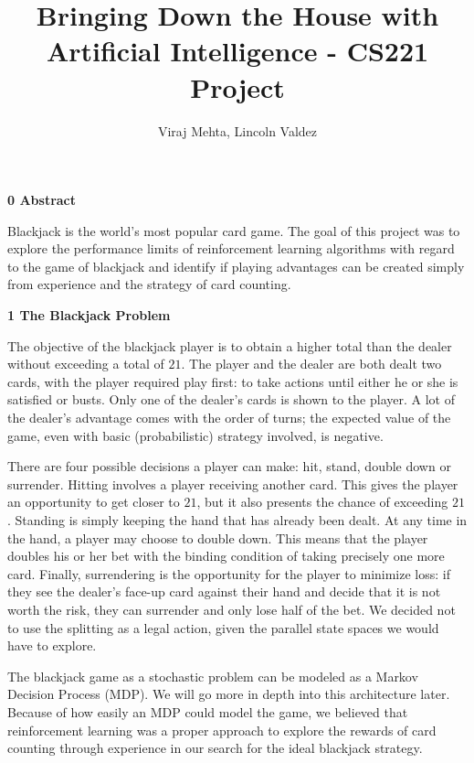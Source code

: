 \documentclass[12pt]{article}
\title{Bringing Down the House with Artificial Intelligence - CS221 Project}
\author{Viraj Mehta, Lincoln Valdez}
\date{}
\begin{document}
	\maketitle
	\vspace{-0.3in}

    {\large \textbf{0 Abstract}} \newline

    Blackjack is the world's most popular card game. The goal of this project was to explore the performance limits of reinforcement learning algorithms with regard to the game of blackjack and identify if playing advantages can be created simply from experience and the strategy of card counting. \newline

    {\large \textbf{1 The Blackjack Problem}} \newline

    The objective of the blackjack player is to obtain a higher total than the dealer without exceeding a total of $21$. The player and the dealer are both dealt two cards, with the player required play first: to take actions until either he or she is satisfied or busts. Only one of the dealer's cards is shown to the player. A lot of the dealer's advantage comes with the order of turns; the expected value of the game, even with basic (probabilistic) strategy involved, is negative. \newline

    There are four possible decisions a player can make: hit, stand, double down or surrender. Hitting involves a player receiving another card. This gives the player an opportunity to get closer to $21$, but it also presents the chance of exceeding $21$. Standing is simply keeping the hand that has already been dealt. At any time in the hand, a player may choose to double down. This means that the player doubles his or her bet with the binding condition of taking precisely one more card. Finally, surrendering is the opportunity for the player to minimize loss: if they see the dealer's face-up card against their hand and decide that it is not worth the risk, they can surrender and only lose half of the bet. We decided not to use the splitting as a legal action, given the parallel state spaces we would have to explore. \newline

    The blackjack game as a stochastic problem can be modeled as a Markov Decision Process (MDP). We will go more in depth into this architecture later. Because of how easily an MDP could model the game, we believed that reinforcement learning was a proper approach to explore the rewards of card counting through experience in our search for the ideal blackjack strategy. \pagebreak
\end{document}
